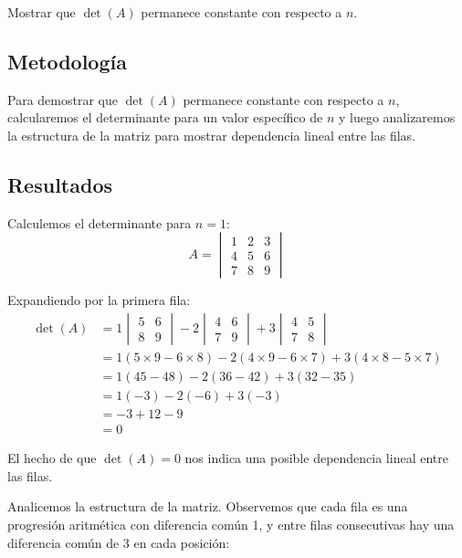 \documentclass{article}
\begin{document}
Mostrar que $\det(A)$ permanece constante con respecto a $n$.

\subsection{Metodología}

Para demostrar que $\det(A)$ permanece constante con respecto a $n$, calcularemos el determinante para un valor específico de $n$ y luego analizaremos la estructura de la matriz para mostrar dependencia lineal entre las filas.

\subsection{Resultados}
\setcounter{equation}{0}

Calculemos el determinante para $n = 1$:
$$A = \begin{vmatrix}
1 & 2 & 3 \\
4 & 5 & 6 \\
7 & 8 & 9
\end{vmatrix}$$

Expandiendo por la primera fila:
\begin{align}
\det(A) &= 1 \begin{vmatrix} 5 & 6 \\ 8 & 9 \end{vmatrix} - 2 \begin{vmatrix} 4 & 6 \\ 7 & 9 \end{vmatrix} + 3 \begin{vmatrix} 4 & 5 \\ 7 & 8 \end{vmatrix} \\
&= 1 (5 \times 9 - 6 \times 8) - 2 (4 \times 9 - 6 \times 7) + 3 (4 \times 8 - 5 \times 7) \\
&= 1 (45 - 48) - 2 (36 - 42) + 3 (32 - 35) \\
&= 1 (-3) - 2 (-6) + 3 (-3) \\
&= -3 + 12 - 9 \\
&= 0
\end{align}

El hecho de que $\det(A) = 0$ nos indica una posible dependencia lineal entre las filas.

Analicemos la estructura de la matriz. Observemos que cada fila es una progresión aritmética con diferencia común 1, y entre filas consecutivas hay una diferencia común de 3 en cada posición:
\end{document}
